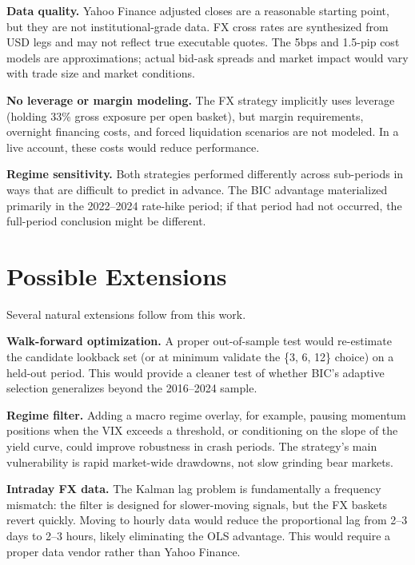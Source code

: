 \documentclass[12pt]{article}
\begin{document}
\textbf{Data quality.} Yahoo Finance adjusted closes are a reasonable starting point, but they are not institutional-grade data. FX cross rates are synthesized from USD legs and may not reflect true executable quotes. The 5bps and 1.5-pip cost models are approximations; actual bid-ask spreads and market impact would vary with trade size and market conditions.

\textbf{No leverage or margin modeling.} The FX strategy implicitly uses leverage (holding 33\% gross exposure per open basket), but margin requirements, overnight financing costs, and forced liquidation scenarios are not modeled. In a live account, these costs would reduce performance.

\textbf{Regime sensitivity.} Both strategies performed differently across sub-periods in ways that are difficult to predict in advance. The BIC advantage materialized primarily in the 2022--2024 rate-hike period; if that period had not occurred, the full-period conclusion might be different.

\section{Possible Extensions}

Several natural extensions follow from this work.

\textbf{Walk-forward optimization.} A proper out-of-sample test would re-estimate the candidate lookback set (or at minimum validate the \{3, 6, 12\} choice) on a held-out period. This would provide a cleaner test of whether BIC's adaptive selection generalizes beyond the 2016--2024 sample.

\textbf{Regime filter.} Adding a macro regime overlay, for example, pausing momentum positions when the VIX exceeds a threshold, or conditioning on the slope of the yield curve, could improve robustness in crash periods. The strategy's main vulnerability is rapid market-wide drawdowns, not slow grinding bear markets.

\textbf{Intraday FX data.} The Kalman lag problem is fundamentally a frequency mismatch: the filter is designed for slower-moving signals, but the FX baskets revert quickly. Moving to hourly data would reduce the proportional lag from 2--3 days to 2--3 hours, likely eliminating the OLS advantage. This would require a proper data vendor rather than Yahoo Finance.
\end{document}
